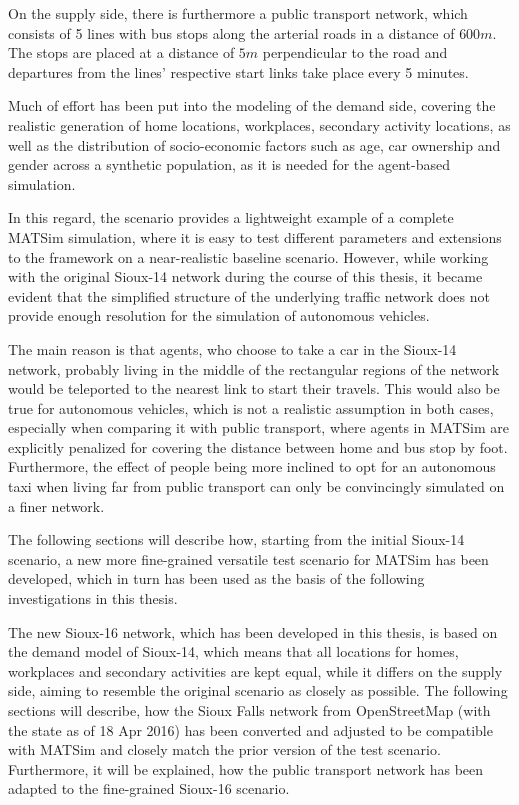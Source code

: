 On the supply side, there is furthermore a public transport network, which
consists of 5 lines with bus stops along the arterial roads in a distance of $600m$.
The stops are placed at a distance of $5m$ perpendicular to the road and departures
from the lines' respective start links take place every 5 minutes.

Much of effort has been put into the modeling of the demand side, covering the
realistic generation of home locations, workplaces, secondary activity locations,
as well as the distribution of socio-economic factors such as age, car ownership
and gender across a synthetic population, as it is needed for the agent-based
simulation.

In this regard, the scenario provides a lightweight example of a complete MATSim
simulation, where it is easy to test different parameters and extensions to the
framework on a near-realistic baseline scenario. However, while working with the
original Sioux-14 network during the course of this thesis, it became evident that
the simplified structure of the underlying traffic network does not provide enough
resolution for the simulation of autonomous vehicles.

The main reason is that agents, who choose to take a car in the Sioux-14 network,
probably living in the middle of the rectangular regions of the network would be
teleported to the nearest link to start their travels. This would also be true
for autonomous vehicles, which is not a realistic assumption in both cases, especially
when comparing it with public transport, where agents in MATSim are explicitly
penalized for covering the distance between home and bus stop by foot.
Furthermore, the effect of people being more inclined to opt for an autonomous taxi
when living far from public transport can only be convincingly simulated on a
finer network.

The following sections will describe how, starting from the initial Sioux-14
scenario, a new more fine-grained versatile test scenario for MATSim has been
developed, which in turn has been used as the basis of the following investigations in this
thesis.

The new Sioux-16 network, which has been developed in this thesis, is based on the
demand model of Sioux-14, which means that all locations for homes, workplaces and
secondary activities are kept equal, while it differs on the supply side, aiming
to resemble the original scenario as closely as possible. The following sections
will describe, how the Sioux Falls network from OpenStreetMap (with the state
as of 18 Apr 2016) has been converted and adjusted to be compatible with MATSim
and closely match the prior version of the test scenario. Furthermore, it will
be explained, how the public transport network has been adapted to the fine-grained
Sioux-16 scenario.

